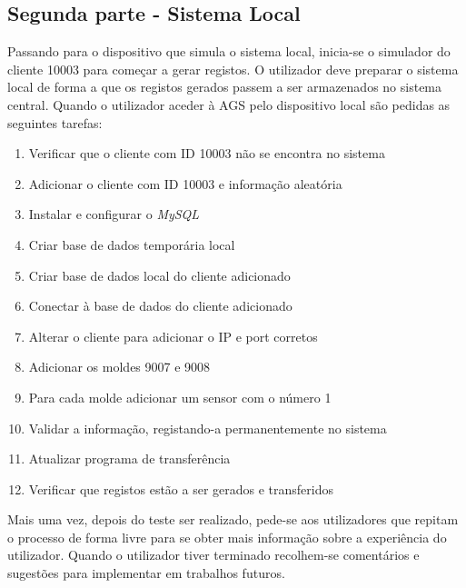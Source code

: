 \documentclass[11pt,twoside,a4paper]{report}
\begin{document}
\subsection{Segunda parte - Sistema Local}
Passando para o dispositivo que simula o sistema local, inicia-se o simulador do cliente 10003 para começar a gerar registos. O utilizador deve preparar o sistema local de forma a que os registos gerados passem a ser armazenados no sistema central. Quando o utilizador aceder à AGS pelo dispositivo local são pedidas as seguintes tarefas:
\begin{enumerate}
	\item Verificar que o cliente com ID 10003 não se encontra no sistema
	\item Adicionar o cliente com ID 10003 e informação aleatória
	\item Instalar e configurar o \textit{MySQL}
	\item Criar base de dados temporária local
	\item Criar base de dados local do cliente adicionado
	\item Conectar à base de dados do cliente adicionado
	\item Alterar o cliente para adicionar o IP e port corretos
	\item Adicionar os moldes 9007 e 9008
	\item Para cada molde adicionar um sensor com o número 1
	\item Validar a informação, registando-a permanentemente no sistema
	\item Atualizar programa de transferência
	\item Verificar que registos estão a ser gerados e transferidos
\end{enumerate}
Mais uma vez, depois do teste ser realizado, pede-se aos utilizadores que repitam o processo de forma livre para se obter mais informação sobre a experiência do utilizador. Quando o utilizador tiver terminado recolhem-se comentários e sugestões para implementar em trabalhos futuros.
\end{document}
